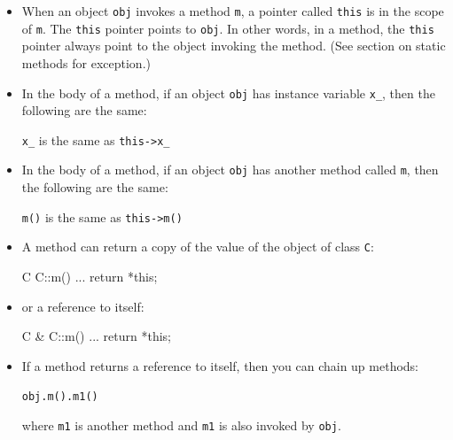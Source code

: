 






\newpage{}

\begin{itemize}
\item When an object \texttt{obj} invokes a method \texttt{m}, a pointer called
  \texttt{this} is in the scope of \texttt{m}. The \texttt{this} pointer
  points to \texttt{obj}. In other words, in a method, the \texttt{this}
  pointer always point to the object invoking the method. (See section
  on static methods for exception.)

\item In the body of a method, if an object \texttt{obj} has instance variable
  \texttt{x\_}, then the following are the same:

\texttt{x\_} is the same as \texttt{this->x\_}

\item In the body of a method, if an object \texttt{obj} has another method
  called \texttt{m}, then the following are the same:

\texttt{m()} is the same as \texttt{this->m()}

\item A method can return a copy of the value of the object of class
  \texttt{C}:

\begin{consolethree}[escapeinside=||]
C C::m()
{
    ...
    return *this;
}
\end{consolethree}

\item or a reference to itself:

\begin{consolethree}[escapeinside=||]
C & C::m()
{
    ...
    return *this;
}
\end{consolethree}

\item If a method returns a reference to itself, then you can chain up
  methods:

\texttt{obj.m().m1()}

  where \texttt{m1} is another method and \texttt{m1} is also invoked by
  \texttt{obj}.


\end{itemize}
